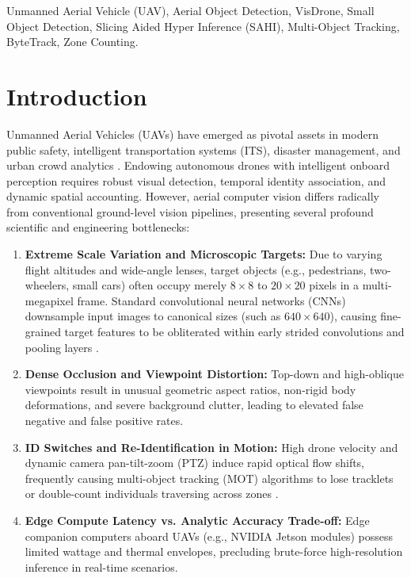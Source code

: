 \documentclass[conference]{IEEEtran}
\begin{document}
\begin{IEEEkeywords}
Unmanned Aerial Vehicle (UAV), Aerial Object Detection, VisDrone, Small Object Detection, Slicing Aided Hyper Inference (SAHI), Multi-Object Tracking, ByteTrack, Zone Counting.
\end{IEEEkeywords}

\section{Introduction}
Unmanned Aerial Vehicles (UAVs) have emerged as pivotal assets in modern public safety, intelligent transportation systems (ITS), disaster management, and urban crowd analytics \cite{zhu2021detection, akyon2022sahi}. Endowing autonomous drones with intelligent onboard perception requires robust visual detection, temporal identity association, and dynamic spatial accounting. However, aerial computer vision differs radically from conventional ground-level vision pipelines, presenting several profound scientific and engineering bottlenecks:

\begin{enumerate}
    \item \textbf{Extreme Scale Variation and Microscopic Targets:} Due to varying flight altitudes and wide-angle lenses, target objects (e.g., pedestrians, two-wheelers, small cars) often occupy merely $8\times 8$ to $20\times 20$ pixels in a multi-megapixel frame. Standard convolutional neural networks (CNNs) downsample input images to canonical sizes (such as $640\times 640$), causing fine-grained target features to be obliterated within early strided convolutions and pooling layers \cite{akyon2022sahi}.
    \item \textbf{Dense Occlusion and Viewpoint Distortion:} Top-down and high-oblique viewpoints result in unusual geometric aspect ratios, non-rigid body deformations, and severe background clutter, leading to elevated false negative and false positive rates.
    \item \textbf{ID Switches and Re-Identification in Motion:} High drone velocity and dynamic camera pan-tilt-zoom (PTZ) induce rapid optical flow shifts, frequently causing multi-object tracking (MOT) algorithms to lose tracklets or double-count individuals traversing across zones \cite{zhang2022bytetrack}.
    \item \textbf{Edge Compute Latency vs. Analytic Accuracy Trade-off:} Edge companion computers aboard UAVs (e.g., NVIDIA Jetson modules) possess limited wattage and thermal envelopes, precluding brute-force high-resolution inference in real-time scenarios.
\end{enumerate}
\end{document}
